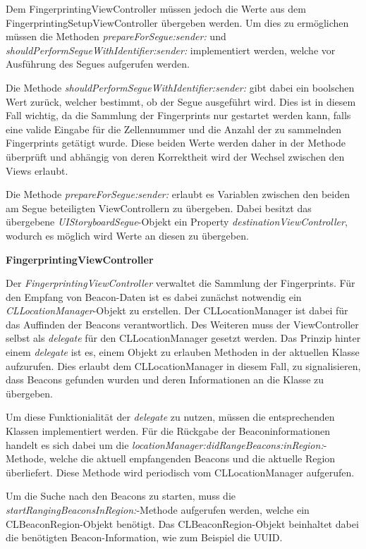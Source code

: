 Dem FingerprintingViewController müssen jedoch die Werte aus dem FingerprintingSetupViewController übergeben werden. Um dies zu ermöglichen müssen die Methoden \emph{prepareForSegue:sender:} und \emph{shouldPerformSegueWithIdentifier:sender:} implementiert werden, welche vor Ausführung des Segues aufgerufen werden.

Die Methode \emph{shouldPerformSegueWithIdentifier:sender:} gibt dabei ein boolschen Wert zurück, welcher bestimmt, ob der Segue ausgeführt wird. Dies ist in diesem Fall wichtig, da die Sammlung der Fingerprints nur gestartet werden kann, falls eine valide Eingabe für die Zellennummer und die Anzahl der zu sammelnden Fingerprints getätigt wurde.
Diese beiden Werte werden daher in der Methode überprüft und abhängig von deren Korrektheit wird der Wechsel zwischen den Views erlaubt.

Die Methode \emph{prepareForSegue:sender:} erlaubt es Variablen zwischen den beiden am Segue beteiligten ViewControllern zu übergeben. Dabei besitzt das übergebene \emph{UIStoryboardSegue}-Objekt ein Property \emph{destinationViewController}, wodurch es möglich wird Werte an diesen zu übergeben. 


\textbf{FingerprintingViewController}


Der \emph{FingerprintingViewController} verwaltet die Sammlung der Fingerprints. 
Für den Empfang von Beacon-Daten ist es dabei zunächst notwendig ein \emph{CLLocationManager}-Objekt zu erstellen. Der CLLocationManager ist dabei für das Auffinden der Beacons verantwortlich.
Des Weiteren muss der ViewController selbst als \emph{delegate} für den CLLocationManager gesetzt werden. 
Das Prinzip hinter einem \emph{delegate} ist es, einem Objekt zu erlauben Methoden in der aktuellen Klasse aufzurufen. Dies erlaubt dem CLLocationManager in diesem Fall, zu signalisieren, dass Beacons gefunden wurden und deren Informationen an die Klasse zu übergeben.

Um diese Funktionialität der \emph{delegate} zu nutzen, müssen die entsprechenden Klassen implementiert werden. Für die Rückgabe der Beaconinformationen handelt es sich dabei um die \emph{locationManager:didRangeBeacons:inRegion:}-Methode, welche die aktuell empfangenden Beacons und die aktuelle Region überliefert. Diese Methode wird periodisch vom CLLocationManager aufgerufen.

Um die Suche nach den Beacons zu starten, muss die \emph{startRangingBeaconsInRegion:}-Methode aufgerufen werden, welche ein CLBeaconRegion-Objekt benötigt.
Das CLBeaconRegion-Objekt beinhaltet dabei die benötigten Beacon-Information, wie zum Beispiel die UUID.

